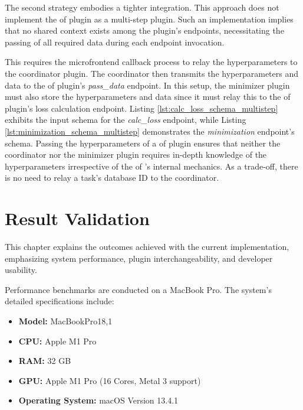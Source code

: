 \documentclass[
  a4paper,  %
  twoside,  %
  bibliography=totoc,
  headsepline,
  cleardoublepage=empty,
  parskip=half,
  draft=false
]{scrbook}
\begin{document}
The second strategy embodies a tighter integration.
This approach does not implement the \gls{of} plugin as a multi-step plugin.
Such an implementation implies that no shared context exists among the plugin's endpoints, necessitating the passing of all required data during each endpoint invocation.

This requires the microfrontend callback process to relay the hyperparameters to the coordinator plugin.
The coordinator then transmits the hyperparameters and data to the \gls{of} plugin's \emph{pass\_data} endpoint.
In this setup, the minimizer plugin must also store the hyperparameters and data since it must relay this to the \gls{of} plugin's loss calculation endpoint.
Listing \ref{lst:calc_loss_schema_multistep} exhibits the input schema for the \emph{calc\_loss} endpoint, while Listing \ref{lst:minimization_schema_multistep} demonstrates the \emph{minimization} endpoint's schema.
Passing the hyperparameters of a \gls{of} plugin ensures that neither the coordinator nor the minimizer plugin requires in-depth knowledge of the hyperparameters irrespective of the \gls{of} 's internal mechanics.
As a trade-off, there is no need to relay a task's database ID to the coordinator.

\noindent\begin{minipage}{\linewidth}
  
\end{minipage}

\noindent\begin{minipage}{\linewidth}
  
\end{minipage}


\chapter{Result Validation}
\label{chap:results}

This chapter explains the outcomes achieved with the current implementation, emphasizing system performance, plugin interchangeability, and developer usability.

Performance benchmarks are conducted on a MacBook Pro. The system's detailed specifications include:

\begin{itemize}
    \item \textbf{Model:} MacBookPro18,1
    \item \textbf{CPU:} Apple M1 Pro
    \item \textbf{RAM:} 32 GB
    \item \textbf{GPU:} Apple M1 Pro (16 Cores, Metal 3 support)
    \item \textbf{Operating System:} macOS Version 13.4.1
\end{itemize}
\end{document}
